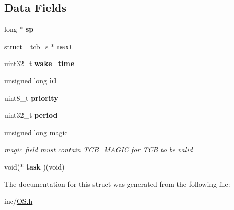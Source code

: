 \subsection*{Data Fields}
\begin{DoxyCompactItemize}
\item 
long $\ast$ {\bfseries sp}\hypertarget{struct__tcb__s_a13f117347df648dbca66e6cbb97a4e0f}{}\label{struct__tcb__s_a13f117347df648dbca66e6cbb97a4e0f}

\item 
struct \hyperlink{struct__tcb__s}{\+\_\+tcb\+\_\+s} $\ast$ {\bfseries next}\hypertarget{struct__tcb__s_af53c260a7b65e7244f809cda9ebb835f}{}\label{struct__tcb__s_af53c260a7b65e7244f809cda9ebb835f}

\item 
uint32\+\_\+t {\bfseries wake\+\_\+time}\hypertarget{struct__tcb__s_a442099ddd859c3f33981828aeef085fe}{}\label{struct__tcb__s_a442099ddd859c3f33981828aeef085fe}

\item 
unsigned long {\bfseries id}\hypertarget{struct__tcb__s_a48e677e5c96cf412d20854802271b9b4}{}\label{struct__tcb__s_a48e677e5c96cf412d20854802271b9b4}

\item 
uint8\+\_\+t {\bfseries priority}\hypertarget{struct__tcb__s_a319151d52db9a3fb0b3c018bce9fcb4a}{}\label{struct__tcb__s_a319151d52db9a3fb0b3c018bce9fcb4a}

\item 
uint32\+\_\+t {\bfseries period}\hypertarget{struct__tcb__s_a85c4e73f3d5ccebf43c628d9e1fc4e4f}{}\label{struct__tcb__s_a85c4e73f3d5ccebf43c628d9e1fc4e4f}

\item 
unsigned long \hyperlink{struct__tcb__s_a1f71cc7a8b23ee420548662caced5301}{magic}\hypertarget{struct__tcb__s_a1f71cc7a8b23ee420548662caced5301}{}\label{struct__tcb__s_a1f71cc7a8b23ee420548662caced5301}

\begin{DoxyCompactList}\small\item\em magic field must contain T\+C\+B\+\_\+\+M\+A\+G\+IC for T\+CB to be valid \end{DoxyCompactList}\item 
void($\ast$ {\bfseries task} )(void)\hypertarget{struct__tcb__s_af815dde5661c4092abe9838fb28d9ed2}{}\label{struct__tcb__s_af815dde5661c4092abe9838fb28d9ed2}

\end{DoxyCompactItemize}


The documentation for this struct was generated from the following file\+:\begin{DoxyCompactItemize}
\item 
inc/\hyperlink{OS_8h}{O\+S.\+h}\end{DoxyCompactItemize}
